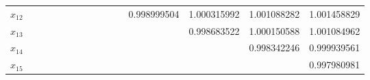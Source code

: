 \documentclass[a4paper]{article}
\begin{document}
\begin{CJK*}{GBK}{song}
\begin{center}
\begin{table*}[!htbp]
{\begin{threeparttable}[!htpb]
\begin{tabular}{ccccc ccccc ccccc}
$x_{12}$	&		&		&		&		&		&		&		&		&		&		&	0.998999504	&	1.000315992	&	1.001088282	&	1.001458829	\\
$x_{13}$	&		&		&		&		&		&		&		&		&		&		&		&	0.998683522	&	1.000150588	&	1.001084962	\\
$x_{14}$	&		&		&		&		&		&		&		&		&		&		&		&		&	0.998342246	&	0.999939561	\\
$x_{15}$	&		&		&		&		&		&		&		&		&		&		&		&		&		&	0.997980981	\\
\bottomrule
\end{tabular}
\end{threeparttable}}%
\end{table*}
\end{center}


\end{CJK*}
\end{document}
